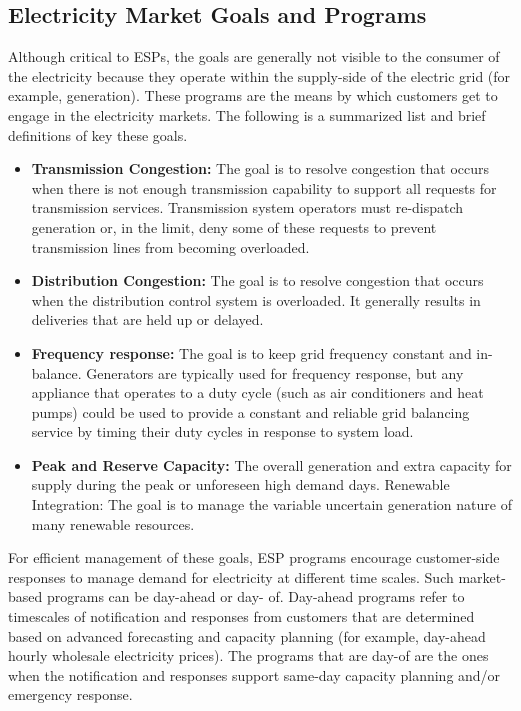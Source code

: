 \subsection{Electricity Market Goals and Programs}
Although critical to ESPs, the goals are generally not visible to the consumer of the electricity because they operate within the supply-side of the electric grid (for example, generation). These programs are the means by which customers get to engage in the electricity markets. The following is a summarized list and brief definitions of key these goals.
\begin{itemize}
\item {\bf Transmission Congestion:} The goal is to resolve congestion that occurs when there is not enough transmission capability to support all requests for transmission services. Transmission system operators must re-dispatch generation or, in the limit, deny some of these requests to prevent transmission lines from becoming overloaded.
\item {\bf Distribution Congestion:} The goal is to resolve congestion that occurs when the distribution control system is overloaded. It generally results in deliveries that are held up or delayed.
\item {\bf Frequency response:} The goal is to keep grid frequency constant and in-balance. Generators are typically used for frequency response, but any appliance that operates to a duty cycle (such as air conditioners and heat pumps) could be used to provide a constant and reliable grid balancing service by timing their duty cycles in response to system load.
\item {\bf Peak and Reserve Capacity:} The overall generation and extra capacity for supply during the peak or unforeseen high demand days. Renewable Integration: The goal is to manage the variable uncertain generation nature of many renewable resources.
\end{itemize}

For efficient management of these goals, ESP programs encourage customer-side responses to manage demand for electricity at different time scales. Such market-based programs can be day-ahead or day- of. Day-ahead programs refer to timescales of notification and responses from customers that are determined based on advanced forecasting and capacity planning (for example, day-ahead hourly wholesale electricity prices). The programs that are day-of are the ones when the notification and responses support same-day capacity planning and/or emergency response.


